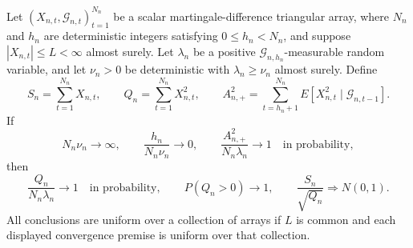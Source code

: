 Let \((X_{n,t},\mathcal G_{n,t})_{t=1}^{N_n}\) be a scalar martingale-difference triangular array, where \(N_n\) and \(h_n\) are deterministic integers satisfying \(0\le h_n<N_n\), and suppose \(|X_{n,t}|\le L<\infty\) almost surely. Let \(\lambda_n\) be a positive \(\mathcal G_{n,h_n}\)-measurable random variable, and let \(\nu_n>0\) be deterministic with \(\lambda_n\ge\nu_n\) almost surely. Define
\[
 S_n=\sum_{t=1}^{N_n}X_{n,t},\qquad
 Q_n=\sum_{t=1}^{N_n}X_{n,t}^2,\qquad
 A_{n,+}^2=\sum_{t=h_n+1}^{N_n}E[X_{n,t}^2\mid\mathcal G_{n,t-1}].
\]
If
\[
 N_n\nu_n\longrightarrow\infty,\qquad
 \frac{h_n}{N_n\nu_n}\longrightarrow0,\qquad
 \frac{A_{n,+}^2}{N_n\lambda_n}\longrightarrow1
 \quad\text{in probability},
\]
then
\[
 \frac{Q_n}{N_n\lambda_n}\longrightarrow1
 \quad\text{in probability},\qquad
 P(Q_n>0)\longrightarrow1,\qquad
 \frac{S_n}{\sqrt{Q_n}}\Rightarrow N(0,1).
\]
All conclusions are uniform over a collection of arrays if \(L\) is common and each displayed convergence premise is uniform over that collection.